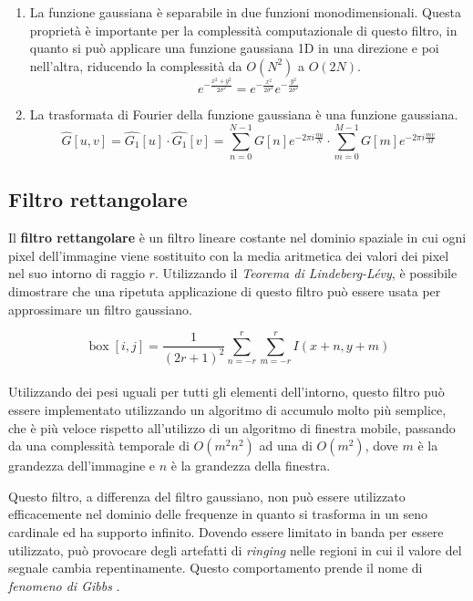 \documentclass[../main.tex]{subfiles}
\begin{document}
\begin{enumerate}
		\item La funzione gaussiana è separabile in due funzioni monodimensionali. Questa proprietà è importante per la complessità computazionale di questo filtro, in quanto si può applicare una funzione gaussiana 1D in una direzione e poi nell'altra, riducendo la complessità da $O(N^2)$ a $O(2N)$.
		\begin{equation}
			e^{-\frac{x^2+y^2}{2\sigma^2}}=e^{-\frac{x^2}{2\sigma^2}}e^{-\frac{y^2}{2\sigma^2}}
		\end{equation}
		\item La trasformata di Fourier della funzione gaussiana è una funzione gaussiana. 
		\begin{equation}
			\hat{G}[u,v] = \hat{G_1}[u]\cdot\hat{G_1}[v] = \sum_{n=0}^{N-1}G[n]e^{-2\pi i\frac{nu}{N}}\cdot\sum_{m=0}^{M-1}G[m]e^{-2\pi i\frac{mv}{M}}
		\end{equation}
	\end{enumerate}
	
	\subsection{Filtro rettangolare}
	
	Il \textbf{filtro rettangolare} è un filtro lineare costante nel dominio spaziale in cui ogni pixel dell'immagine viene sostituito con la media aritmetica dei valori dei pixel nel suo intorno di raggio $r$. Utilizzando il \textit{Teorema di Lindeberg-Lévy}, è possibile dimostrare che una ripetuta applicazione di questo filtro può essere usata per approssimare un filtro gaussiano\cite{getreuer_2013}.
	
	\begin{equation}
		\operatorname{box}[i,j] = \frac{1}{(2r+1)^2}\sum_{n=-r}^{r}\sum_{m=-r}^{r} I(x+n, y+m)
	\end{equation}
	\\[-10pt]
	Utilizzando dei pesi uguali per tutti gli elementi dell'intorno, questo filtro può essere implementato utilizzando un algoritmo di accumulo molto più semplice, che è  più veloce rispetto all'utilizzo di un algoritmo di finestra mobile, passando da una complessità temporale di $O(m^2n^2)$ ad una di $O(m^2)$, dove $m$ è la grandezza dell'immagine e $n$ è la grandezza della finestra.\cite{jarosz_2001}
	
	Questo filtro, a differenza del filtro gaussiano, non può essere utilizzato efficacemente nel dominio delle frequenze in quanto si trasforma in un seno cardinale ed ha supporto infinito. Dovendo essere limitato in banda per essere utilizzato, può provocare degli artefatti di \textit{ringing} nelle regioni in cui il valore del segnale cambia repentinamente. Questo comportamento prende il nome di \textit{fenomeno di Gibbs} \cite{carslaw_1925}.\medskip
	
\end{document}
